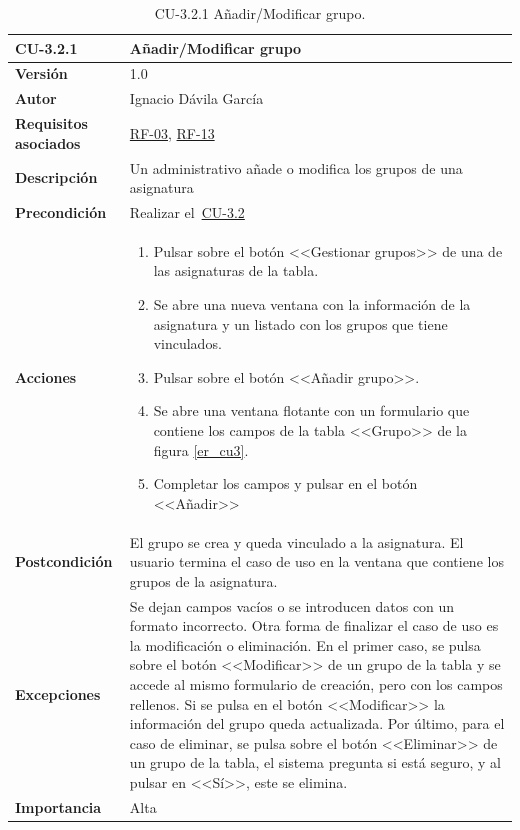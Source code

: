 \begin{table}[p]
\label{table:CU-3.2.1}
	\centering
	\begin{tabularx}{\linewidth}{ p{} p{} }
		\toprule
		\textbf{CU-3.2.1}    & \textbf{Añadir/Modificar grupo}\\
		\toprule
		\textbf{Versión}              & 1.0    \\
		\textbf{Autor}                & Ignacio Dávila García \\
		\textbf{Requisitos asociados} & \hyperref[itm:RF3]{RF-03}, \hyperref[itm:RF13]{RF-13} \\
		\textbf{Descripción}          & Un administrativo añade o modifica los grupos de una asignatura \\
		\textbf{Precondición}         & Realizar el~\hyperref[table:CU-3.2]{CU-3.2} \\
		\textbf{Acciones}             &
		\begin{enumerate}
			\def\labelenumi{\arabic{enumi}.}
			\tightlist
			\item Pulsar sobre el botón <<Gestionar grupos>> de una de las asignaturas de la tabla.
			\item Se abre una nueva ventana con la información de la asignatura y un listado con los grupos que tiene vinculados.
			\item Pulsar sobre el botón <<Añadir grupo>>.
			\item Se abre una ventana flotante con un formulario que contiene los campos de la tabla <<Grupo>> de la figura \ref{er_cu3}.
			\item Completar los campos y pulsar en el botón <<Añadir>>
		\end{enumerate}\\
		\textbf{Postcondición}        & El grupo se crea y queda vinculado a la asignatura. El usuario termina el caso de uso en la ventana que contiene los grupos de la asignatura. \\
		\textbf{Excepciones}          & Se dejan campos vacíos o se introducen datos con un formato incorrecto. Otra forma de finalizar el caso de uso es la modificación o eliminación. En el primer caso, se pulsa sobre el botón <<Modificar>> de un grupo de la tabla y se accede al mismo formulario de creación, pero con los campos rellenos. Si se pulsa en el botón <<Modificar>> la información del grupo queda actualizada. Por último, para el caso de eliminar, se pulsa sobre el botón <<Eliminar>> de un grupo de la tabla, el sistema pregunta si está seguro, y al pulsar en <<Sí>>, este se elimina. \\
		\textbf{Importancia}          & Alta \\
		\bottomrule
	\end{tabularx}
	\caption{CU-3.2.1 Añadir/Modificar grupo.}
\end{table}
\FloatBarrier

